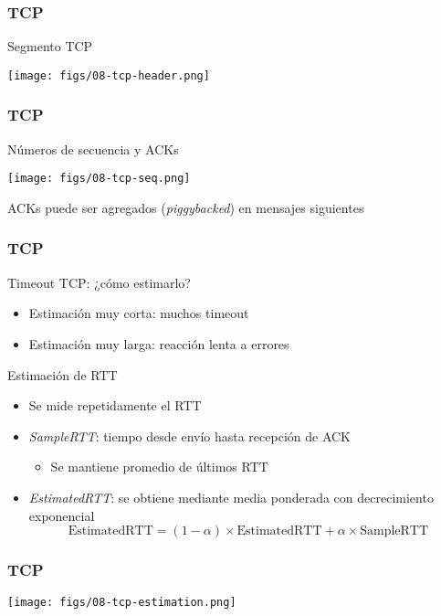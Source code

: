 \documentclass[letter]{beamer}
\begin{document}
\begin{frame}
  \frametitle{TCP}

  Segmento TCP
  \begin{center}
    \texttt{[image: figs/08-tcp-header.png]}
  \end{center}

\end{frame}
\begin{frame}
  \frametitle{TCP}

  Números de secuencia y ACKs
  \begin{center}
    \texttt{[image: figs/08-tcp-seq.png]}
  \end{center}

  ACKs puede ser agregados ({\em piggybacked}) en mensajes siguientes
\end{frame}
\begin{frame}
  \frametitle{TCP}

  Timeout TCP: ¿cómo estimarlo?
  \begin{itemize}
    \item Estimación muy corta: muchos timeout
    \item Estimación muy larga: reacción lenta a errores
  \end{itemize}
  Estimación de RTT
  \begin{itemize}
    \item Se mide repetidamente el RTT
    \item {\em SampleRTT}: tiempo desde envío hasta recepción de ACK
      \begin{itemize}
        \item Se mantiene promedio de últimos RTT
      \end{itemize}
    \item {\em EstimatedRTT}: se obtiene mediante media ponderada con decrecimiento exponencial
      \[ \text{EstimatedRTT} = (1-\alpha) \times \text{EstimatedRTT} + \alpha \times \text{SampleRTT} \]
  \end{itemize}
\end{frame}
\begin{frame}
  \frametitle{TCP}

  \begin{center}
    \texttt{[image: figs/08-tcp-estimation.png]}
  \end{center}

\end{frame}
\end{document}
